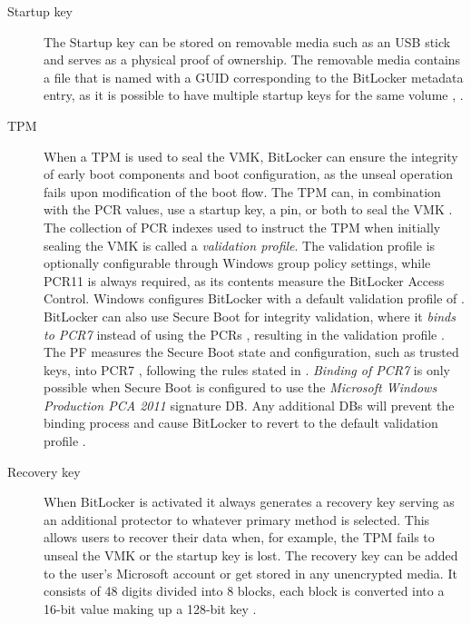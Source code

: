 \begin{description}
    \item[Startup key] The Startup key can be stored on removable media such as an \ac{USB} stick and serves as a physical proof of ownership.
        The removable media contains a  file that is named with a \ac{GUID} corresponding to the BitLocker metadata entry, as it is possible to have multiple startup keys for the same volume \cite[Section 2.6]{bde-format-spec}, \cite{microsoft-windows-prepare-your-org}.

    \item[TPM]
        When a \ac{TPM} is used to seal the \ac{VMK}, BitLocker can ensure the integrity of early boot components and boot configuration, as the unseal operation fails upon modification of the boot flow.
        The \ac{TPM} can, in combination with the \ac{PCR} values, use a startup key, a pin, or both to seal the \ac{VMK} \cite{microsoft-bitlocker-countermeasures}.
        The collection of \ac{PCR} indexes used to instruct the \ac{TPM} when initially sealing the \ac{VMK} is called a \emph{validation profile}.
        The validation profile is optionally configurable through Windows group policy settings, while \ac{PCR}11 is always required, as its contents measure the BitLocker Access Control.
        Windows configures BitLocker with a default validation profile of \hyperref[tab:pcr-usage]{} \cite{microsoft-windows-bitlocker-group-policy-settings}.
        BitLocker can also use Secure Boot for integrity validation, where it \hypertarget{pcr7-binding}{\emph{binds to \ac{PCR}7}} instead of using the \acp{PCR} \hyperref[tab:pcr-usage]{}, resulting in the validation profile \hyperref[tab:pcr-usage]{} \cite{microsoft-windows-bitlocker-group-policy-settings-pcr7}.
        The \ac{PF} measures the Secure Boot state and configuration, such as trusted keys, into \ac{PCR}7 \cite{microsoft-windows-bitlocker-group-policy-settings-pcr7}, following the rules stated in \cite{microsoft-trusted-execution-environment}.
        \emph{Binding of \ac{PCR}7} is only possible when Secure Boot is configured to use the \emph{Microsoft Windows Production PCA 2011} signature \ac{DB}. Any additional \acp{DB} will prevent the binding process and cause BitLocker to revert to the default validation profile \cite{microsoft-pcr7-binding}.

    \item[Recovery key]
        When BitLocker is activated it always generates a recovery key serving as an additional protector to whatever primary method is selected.
        This allows users to recover their data when, for example, the \ac{TPM} fails to unseal the \ac{VMK} or the startup key is lost.
        The recovery key can be added to the user's Microsoft account or get stored in any unencrypted media.
        It consists of 48 digits divided into 8 blocks, each block is converted into a 16-bit value making up a 128-bit key \cite[Section 2.4]{bde-format-spec}.


\end{description}
